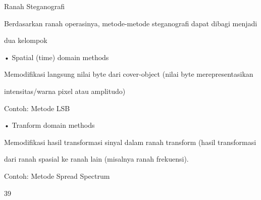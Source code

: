 \documentclass{article}
\begin{document}

Ranah Steganografi

Berdasarkan  ranah operasinya, metode-metode steganografi dapat dibagi menjadi 

dua kelompok 

• Spatial (time) domain methods

    Memodifikasi langsung nilai byte dari cover-object (nilai byte merepresentasikan 

intensitas/warna pixel atau amplitudo)

 Contoh: Metode LSB

• Tranform domain methods

    Memodifikasi hasil transformasi sinyal dalam ranah transform (hasil  transformasi 

dari ranah spasial ke ranah lain (misalnya ranah frekuensi). 

 Contoh: Metode Spread Spectrum

39
\end{document}
